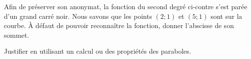 
\begin{exercice}\label{exosmath-0146}

    \begin{multicols}{2}
    Afin de préserver son anonymat, la fonction du second degré ci-contre s'est parée d'un grand carré noir. Nous savons que les points \( (2;1)\) et \( (5;1)\) sont sur la courbe. À défaut de pouvoir reconnaître la fonction, donner l'abscisse de son sommet.

    Justifier en utilisant un calcul ou des propriétés des paraboles.

    \columnbreak

    \begin{center}

    \end{center}

    \end{multicols}
    

\end{exercice}
